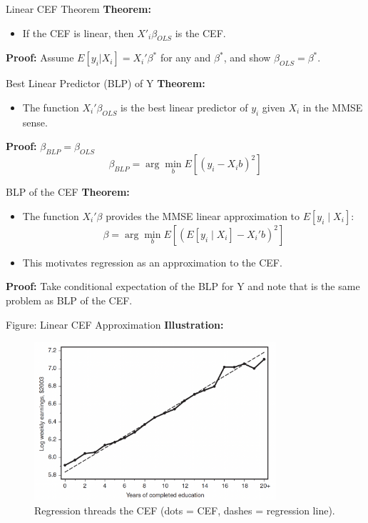 \documentclass[xcolor=svgnames,t]{beamer}
\begin{document}
\begin{frame}{Linear CEF Theorem}
    \textbf{Theorem:}
    \begin{itemize}
        \item If the CEF is linear, then $X'_i\beta_{OLS}$ is the CEF.

    \end{itemize}
    \vspace{1cm}
    \textbf{Proof:} Assume \( E[y_i | X_i] = X_i' \beta^* \) for any and $\beta^* $,  and show \( \beta_{OLS} = \beta^* \).
\end{frame}

\begin{frame}{Best Linear Predictor (BLP) of Y}
    \textbf{Theorem:}
    \begin{itemize}
        \item The function \( X_i' \beta_{OLS} \) is the best linear predictor of \( y_i \) given \( X_i \) in the MMSE sense.
        
        
    \end{itemize}
    \vspace{1cm}
    \textbf{Proof:} $\beta_{BLP}=\beta_{OLS}$
    \[
        \beta_{BLP} = \arg \min_b E[(y_i - X_i b)^2]
        \]
\end{frame}

\begin{frame}{BLP of the CEF}
    \textbf{Theorem:}
    \begin{itemize}
        \item The function \( X_i' \beta \) provides the MMSE linear approximation to \( E[y_i \mid X_i] \):
        \[
        \beta = \arg \min_b E[(E[y_i \mid X_i] - X_i' b)^2]
        \]
        \item This motivates regression as an approximation to the CEF.
    \end{itemize}
    \vspace{1cm}
    \pause
    \textbf{Proof:} Take conditional expectation of the BLP for Y and note that is the same problem as BLP of the CEF.
\end{frame}

\begin{frame}{Figure: Linear CEF Approximation}
    \textbf{Illustration:}
    \begin{figure}[ht]
        \centering
        \includegraphics[width=0.8\textwidth]{Figures/Linear_CEF.png}
        \caption{Regression threads the CEF (dots = CEF, dashes = regression line).}
        \label{fig:linear_cef}
    \end{figure}
\end{frame}
\end{document}
